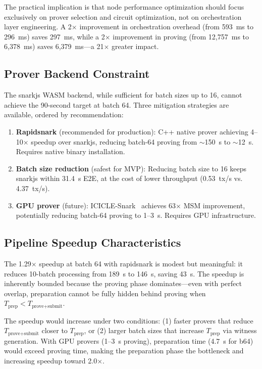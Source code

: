 The practical implication is that node performance optimization should
focus exclusively on prover selection and circuit optimization, not on
orchestration layer engineering. A 2$\times$ improvement in orchestration
overhead (from 593~ms to 296~ms) saves 297~ms, while a 2$\times$
improvement in proving (from 12,757~ms to 6,378~ms) saves 6,379~ms---a
21$\times$ greater impact.

\subsection{Prover Backend Constraint}

The snarkjs WASM backend, while sufficient for batch sizes up to 16,
cannot achieve the 90-second target at batch 64. Three mitigation
strategies are available, ordered by recommendation:

\begin{enumerate}
\item \textbf{Rapidsnark} (recommended for production): C++ native prover
  achieving 4--10$\times$ speedup over snarkjs, reducing batch-64 proving
  from $\sim$150~s to $\sim$12~s. Requires native binary installation.

\item \textbf{Batch size reduction} (safest for MVP): Reducing batch size
  to 16 keeps snarkjs within 31.4~s E2E, at the cost of lower throughput
  (0.53~tx/s vs. 4.37~tx/s).

\item \textbf{GPU prover} (future): ICICLE-Snark~\cite{icicle2025snark}
  achieves 63$\times$ MSM improvement, potentially reducing batch-64
  proving to 1--3~s. Requires GPU infrastructure.
\end{enumerate}

\subsection{Pipeline Speedup Characteristics}

The 1.29$\times$ speedup at batch 64 with rapidsnark is modest but
meaningful: it reduces 10-batch processing from 189~s to 146~s, saving
43~s. The speedup is inherently bounded because the proving phase
dominates---even with perfect overlap, preparation cannot be fully hidden
behind proving when $T_\text{prep} < T_\text{prove+submit}$.

The speedup would increase under two conditions: (1) faster provers that
reduce $T_\text{prove+submit}$ closer to $T_\text{prep}$, or (2) larger
batch sizes that increase $T_\text{prep}$ via witness generation. With
GPU provers (1--3~s proving), preparation time (4.7~s for b64) would
exceed proving time, making the preparation phase the bottleneck and
increasing speedup toward 2.0$\times$.

